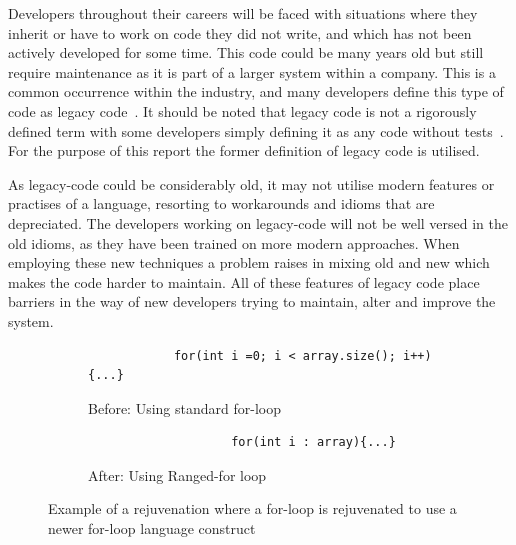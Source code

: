 \documentclass[bsc,frontabs,singlespacing,twoside,parskip,deptreport]{infthesis}
\begin{document}

Developers throughout their careers will be faced with situations where they inherit or have to work on code they did not write, and which has not been actively developed for some time. This code could be many years old but still require maintenance as it is part of a larger system within a company. This is a common occurrence within the industry, and many developers define this type of code as legacy code~\cite{LEGACY_CODE}. It should be noted that legacy code is not a rigorously defined term with some developers simply defining it as any code without tests~\cite{feathers2004working}. For the purpose of this report the former definition of legacy code is utilised. 


As legacy-code could be considerably old, it may not utilise modern features or practises of a language, resorting to workarounds and idioms that are depreciated. The developers working on legacy-code will not be well versed in the old idioms, as they have been trained on more modern approaches. When employing these new techniques a problem raises in mixing old and new which makes the code harder to maintain. All of these features of legacy code place barriers in the way of new developers trying to maintain, alter and improve the system. 

\begin{figure}[H]
    \centering
    
    \begin{subfigure}[h]{\textwidth}
        \begin{verbatim}
            for(int i =0; i < array.size(); i++){...}
        \end{verbatim}
        \caption{Before: Using standard for-loop}
        \vspace{0.2cm}
        \label{fig:for-arr-before}
    \end{subfigure}
    
    \begin{subfigure}[h]{\textwidth}
        \centering
        \begin{verbatim}
                    for(int i : array){...}
        \end{verbatim}
        \caption{After: Using Ranged-for loop}
        \label{fig:for-arr-after}
    \end{subfigure}

    \caption{Example of a rejuvenation where a for-loop is rejuvenated to use a newer for-loop language construct}
    \label{fig:example-rejuv}
\end{figure}
\end{document}
